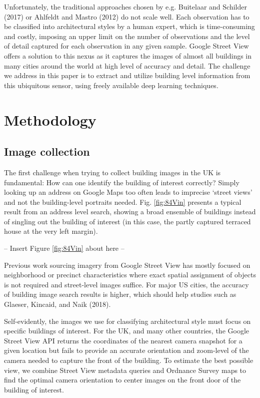 \documentclass[]{article}
\begin{document}
Unfortunately, the traditional approaches chosen by e.g. Buitelaar and
Schilder (2017) or Ahlfeldt and Mastro (2012) do not scale well. Each
observation has to be classified into architectural styles by a human
expert, which is time-consuming and costly, imposing an upper limit on
the number of observations and the level of detail captured for each
observation in any given sample. Google Street View offers a solution to
this nexus as it captures the images of almost all buildings in many
cities around the world at high level of accuracy and detail. The
challenge we address in this paper is to extract and utilize building
level information from this ubiquitous sensor, using freely available
deep learning techniques.

\hypertarget{methodology}{%
\section{Methodology}\label{methodology}}

\hypertarget{image-collection}{%
\subsection{Image collection}\label{image-collection}}

The first challenge when trying to collect building images in the UK is
fundamental: How can one identify the building of interest correctly?
Simply looking up an address on Google Maps too often leads to imprecise
`street views' and not the building-level portraits needed. Fig.
\ref{fig:84Vin} presents a typical result from an address level search,
showing a broad ensemble of buildings instead of singling out the
building of interest (in this case, the partly captured terraced house
at the very left margin).

\begin{center}
  -- Insert Figure \ref{fig:84Vin} about here --
\end{center}

Previous work sourcing imagery from Google Street View has mostly
focused on neighborhood or precinct characteristics where exact spatial
assignment of objects is not required and street-level images suffice.
For major US cities, the accuracy of building image search results is
higher, which should help studies such as Glaeser, Kincaid, and Naik
(2018).

Self-evidently, the images we use for classifying architectural style
must focus on specific buildings of interest. For the UK, and many other
countries, the Google Street View API returns the coordinates of the
nearest camera snapshot for a given location but fails to provide an
accurate orientation and zoom-level of the camera needed to capture the
front of the building. To estimate the best possible view, we combine
Street View metadata queries and Ordnance Survey maps to find the
optimal camera orientation to center images on the front door of the
building of interest.
\end{document}
